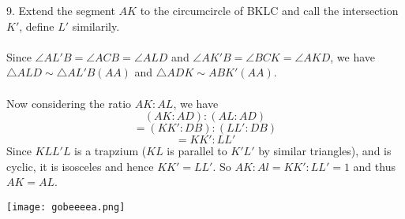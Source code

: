 \documentclass{article}
\begin{document}
9. Extend the segment $AK$ to the circumcircle of BKLC and call the intersection $K'$, define $L'$ similarily. \\\\ Since $\angle AL'B = \angle ACB = \angle ALD$ and $\angle AK'B = \angle BCK = \angle AKD$, we have $\triangle ALD \sim \triangle AL'B (AA)$ and $\triangle ADK \sim ABK' (AA) $. \\\\ Now considering the ratio $AK:AL$, we have $$(AK:AD):(AL:AD)$$ $$=(KK':DB):(LL':DB)$$ $$=KK':LL'$$ Since $KLL'L$ is a trapzium ($KL$ is parallel to $K'L'$ by similar triangles), and is cyclic, it is isosceles and hence $KK'=LL'$. So $AK:Al = KK':LL' = 1$ and thus $AK = AL$. 
\\
\centerline{\texttt{[image: gobeeeea.png]}} 
\end{document}
